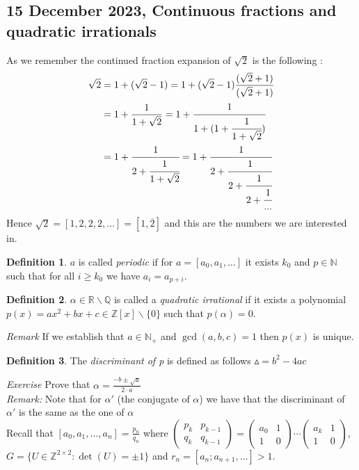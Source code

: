 \documentclass[a4paper,11pt,american]{article}
\newcommand{\N}{\mathbb{N}}
\newcommand{\Q}{\mathbb{Q}}
\newcommand{\R}{\mathbb{R}}
\newcommand{\Z}{\mathbb{Z}}
\theoremstyle{plain}
\theoremstyle{definition}
\newtheorem{definition}{Definition}
\begin{document}
\subsection*{15 December 2023, Continuous fractions and quadratic irrationals}
As we remember the continued fraction expansion of $\sqrt{2}$ is the following :\begin{align*}
    \sqrt{2}&=1+(\sqrt{2}-1)=1+(\sqrt{2}-1)\dfrac{(\sqrt{2}+1)}{(\sqrt{2}+1)}\\
    &=1+\dfrac{1}{1+\sqrt{2}}=1+\cfrac{1}{1+(1+\cfrac{1}{1+\sqrt{2}})}\\
    &=1+\cfrac{1}{2+\cfrac{1}{1+\sqrt{2}}}=1+\cfrac{1}{2+\cfrac{1}{2+\cfrac{1}{2+\cfrac{1}{...}}}}
\end{align*}
Hence $\sqrt{2}=[1,2,2,2,\dots]=[1,\overline{2}]$ and this are the numbers we are interested in.\\
\begin{definition}
    $a$ is called \emph{periodic} if for $a=[a_0,a_1,\dots]$ it exists $k_0$ and $p\in\N$ such that for all $i\geq k_0$ we have $a_i=a_{p+i}$.
\end{definition}
\begin{definition}
    $\alpha\in\R\backslash\Q$ is called a \emph{quadratic irrational} if it exists a polynomial $p(x)=ax^2+bx+c\in\Z[x]\backslash\{0\}$ such that $p(\alpha)=0$.
\end{definition}
\emph{Remark} If we establish that $a\in\N_+$ and $\gcd (a,b,c)=1$ then $p(x)$ is unique.
\\
\begin{definition}
    The \emph{discriminant of p} is defined as follows $\vartriangle=b^2-4ac$
\end{definition}
\emph{Exercise} Prove that $\alpha=\frac{-b\pm\sqrt{\vartriangle}}{2\cdot a}$\\
\emph{Remark:} Note that for $\alpha'$ (the conjugate of $\alpha$) we have that the discriminant of $\alpha'$ is the same as the one of $\alpha$\\
Recall that $[a_0,a_1,\dots,a_n]=\frac{p_n}{q_n}$ where $\begin{pmatrix}
    p_k & p_{k-1} \\
    q_k & q_{k-1}
  \end{pmatrix} =
  \begin{pmatrix}
    a_0 & 1\\
    1 & 0
  \end{pmatrix} \cdots
  \begin{pmatrix}
    a_k & 1 \\
    1 & 0
  \end{pmatrix}$, $G=\{U\in\Z^{2\times2}:\det(U)=\pm1\}$ and $r_n=[a_n;a_{n+1},\dots]>1$.
\end{document}
